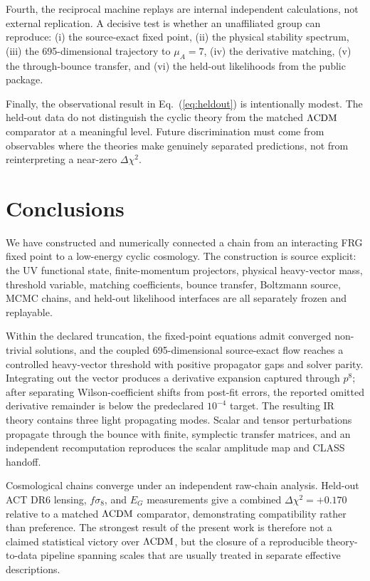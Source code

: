 \documentclass[12pt]{iopart}
\newcommand{\LCDM}{\Lambda{\rm CDM}}
\begin{document}
Fourth, the reciprocal machine replays are internal independent calculations, not external replication.  A decisive test is whether an unaffiliated group can reproduce: (i) the source-exact fixed point, (ii) the physical stability spectrum, (iii) the 695-dimensional trajectory to $\mu_A=7$, (iv) the derivative matching, (v) the through-bounce transfer, and (vi) the held-out likelihoods from the public package.

Finally, the observational result in Eq.~(\ref{eq:heldout}) is intentionally modest.  The held-out data do not distinguish the cyclic theory from the matched $\LCDM$ comparator at a meaningful level.  Future discrimination must come from observables where the theories make genuinely separated predictions, not from reinterpreting a near-zero $\Delta\chi^2$.

\section{Conclusions}
\label{sec:conclusions}

We have constructed and numerically connected a chain from an interacting FRG fixed point to a low-energy cyclic cosmology.  The construction is source explicit: the UV functional state, finite-momentum projectors, physical heavy-vector mass, threshold variable, matching coefficients, bounce transfer, Boltzmann source, MCMC chains, and held-out likelihood interfaces are all separately frozen and replayable.

Within the declared truncation, the fixed-point equations admit converged non-trivial solutions, and the coupled 695-dimensional source-exact flow reaches a controlled heavy-vector threshold with positive propagator gaps and solver parity.  Integrating out the vector produces a derivative expansion captured through $p^8$; after separating Wilson-coefficient shifts from post-fit errors, the reported omitted derivative remainder is below the predeclared $10^{-4}$ target.  The resulting IR theory contains three light propagating modes.  Scalar and tensor perturbations propagate through the bounce with finite, symplectic transfer matrices, and an independent recomputation reproduces the scalar amplitude map and CLASS handoff.

Cosmological chains converge under an independent raw-chain analysis.  Held-out ACT DR6 lensing, $f\sigma_8$, and $E_G$ measurements give a combined $\Delta\chi^2=+0.170$ relative to a matched $\LCDM$ comparator, demonstrating compatibility rather than preference.  The strongest result of the present work is therefore not a claimed statistical victory over $\LCDM$, but the closure of a reproducible theory-to-data pipeline spanning scales that are usually treated in separate effective descriptions.
\end{document}
